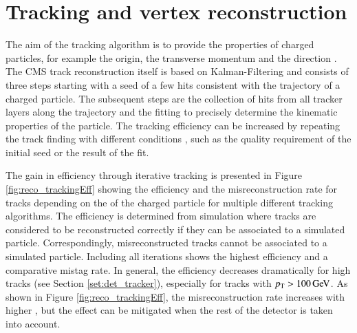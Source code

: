 \section{Tracking and vertex reconstruction}
\label{sec:SimReco_Track}


The aim of the tracking algorithm is to provide the properties of charged particles, for example the origin, the transverse momentum and the direction \cite{Sirunyan:2017ulk}.
The CMS track reconstruction itself is based on Kalman-Filtering \cite{Adam:934067} and consists of three steps starting with a seed of a few hits consistent with the trajectory of a charged particle.
The subsequent steps are the collection of hits from all tracker layers along the trajectory and the fitting to precisely determine the kinematic properties of the particle.
The tracking efficiency can be increased by repeating the track finding with different conditions \cite{1748-0221-9-10-P10009}, such as the quality requirement of the initial seed or the result of the fit.

The gain in efficiency through iterative tracking is presented in Figure \ref{fig:reco_trackingEff} showing the efficiency and the misreconstruction rate for tracks depending on the \pt of the charged particle for 
multiple different tracking algorithms. The efficiency is determined from simulation where tracks are considered to be reconstructed correctly if they can be associated to a simulated particle. Correspondingly, 
misreconstructed tracks cannot be associated to a simulated particle. 
Including all iterations shows the highest efficiency and a comparative mistag rate. In general, the efficiency decreases dramatically for high \pt tracks (see Section \ref{set:det_tracker}), especially for tracks with $p_{\mathrm{T}} > 100 \,\text{Ge\hspace{-.08em}V}$.
As shown in Figure \ref{fig:reco_trackingEff}, the misreconstruction rate increases with higher \pt, but the effect can be mitigated when the rest of the detector is taken into account.

